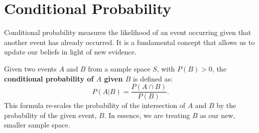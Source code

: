 \section{Conditional Probability}

Conditional probability measures the likelihood of an event occurring given that another event has already occurred. It is a fundamental concept that allows us to update our beliefs in light of new evidence.

\begin{definition}
Given two events $A$ and $B$ from a sample space $S$, with $P(B) > 0$, the \textbf{conditional probability of $A$ given $B$} is defined as:
\[
    P(A|B) = \frac{P(A \cap B)}{P(B)}.
\]
This formula re-scales the probability of the intersection of $A$ and $B$ by the probability of the given event, $B$. In essence, we are treating $B$ as our new, smaller sample space.
\end{definition}

